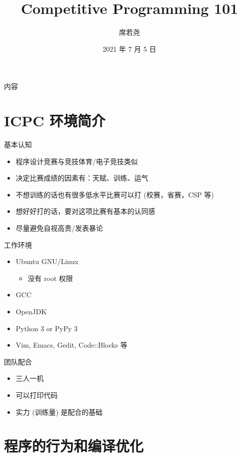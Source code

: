 \documentclass[10pt,mathserif]{beamer}
\title{Competitive Programming 101}
\institute{西安电子科技大学程序设计竞赛实训基地}
\author{席若尧}
\date{2021 年 7 月 5 日}
\begin{document}
%
{\xdbg {}}

\begin{frame}{内容}
	\tableofcontents[hideallsubsections]
\end{frame}

\section{ICPC 环境简介}
\sectionpage

\begin{frame}{基本认知}
	\begin{itemize}
		\item 程序设计竞赛与竞技体育/电子竞技类似
		\item 决定比赛成绩的因素有：天赋、训练、运气
		\item 不想训练的话也有很多低水平比赛可以打 (校赛，省赛，CSP 等)
		\item 想好好打的话，要对这项比赛有基本的认同感
		\item 尽量避免自视高贵/发表暴论
	\end{itemize}
\end{frame}

\begin{frame}{工作环境}
	\begin{itemize}
		\item Ubuntu GNU/Linux
			\begin{itemize}
				\item 没有 root 权限
			\end{itemize}
		\item GCC
		\item OpenJDK
		\item Python 3 or PyPy 3
		\item Vim, Emacs, Gedit, Code::Blocks 等
	\end{itemize}
\end{frame}

\begin{frame}{团队配合}
	\begin{itemize}
		\item 三人一机
		\item 可以打印代码
		\item 实力 (训练量) 是配合的基础
	\end{itemize}
\end{frame}

\section{程序的行为和编译优化}
\sectionpage
\end{document}
